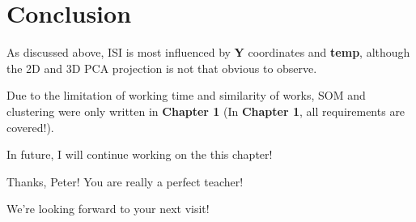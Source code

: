 \documentclass[titlepage,a4paper,12pt,thmsb]{report}
\begin{document}
\begin{center}
\begin{figure}[h]
{\par}
\end{figure}
{}
\end{center}

\newpage

\section{Conclusion}

As discussed above, ISI is most influenced by {\bf{Y}} coordinates and {\bf{temp}}, although the 2D and 3D PCA projection is not that obvious to observe.

Due to the limitation of working time and similarity of works, SOM and clustering were only written in {\bf{Chapter 1}} (In {\bf{Chapter 1}}, all requirements are covered!).

In future, I will continue working on the this chapter!

Thanks, Peter! You are really a perfect teacher!

We're looking forward to your next visit!



\end{document}

